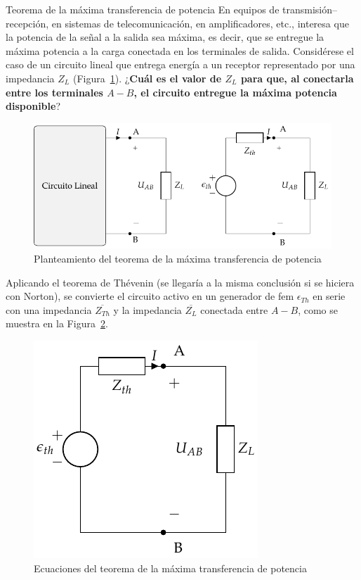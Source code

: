 \documentclass[11pt]{book} %
\makeatletter
\numberwithin{dummy}{section}
\theoremstyle{ocrenumbox}
\theoremstyle{blacknumex}
\theoremstyle{blacknumbox}
\theoremstyle{ocrenum}
\renewcommand{\section}{\@startsection{section}{1}{\z@}
{-4ex \@plus -1ex \@minus -.4ex}
{1ex \@plus.2ex }
{\normalfont\large\sffamily\bfseries}}
\makeatother
\begin{document}
\section{Teorema de la máxima transferencia de potencia}
En equipos de transmisión--recepción, en sistemas de telecomunicación, en amplificadores, etc., interesa que la potencia de la señal a la salida sea máxima, es decir, que se entregue la máxima potencia a la carga conectada en los terminales de salida. Considérese el caso de un circuito lineal que entrega energía a un receptor representado por una impedancia $Z_L$ (Figura~\ref{fig.planteamiento_mtp}). ¿\textbf{Cuál es el valor de $Z_L$ para que, al conectarla entre los terminales $A-B$, el circuito entregue la máxima potencia disponible}?
\begin{figure}[htbp]
    \centering
    \includegraphics[width=0.35\linewidth]{../figs/EquivalenteThevenin.pdf}
    \caption{Planteamiento del teorema de la máxima transferencia de potencia}
    \label{fig.planteamiento_mtp}
\end{figure}

Aplicando el teorema de Thévenin (se llegaría a la misma conclusión si se hiciera con Norton), se convierte el circuito activo en un generador de fem $\epsilon_{Th}$ en serie con una impedancia $\overline{Z_{Th}}$ y la impedancia $\overline{Z_L}$ conectada entre $A-B$, como se muestra en la Figura~\ref{fig.equivalenteThevenin0}. 
\begin{figure}[htbp]
    \centering
    \includegraphics{../figs/EquivalenteThevenin0.pdf}
    \caption{Ecuaciones del teorema de la máxima transferencia de potencia}
    \label{fig.equivalenteThevenin0}
\end{figure}
\end{document}
